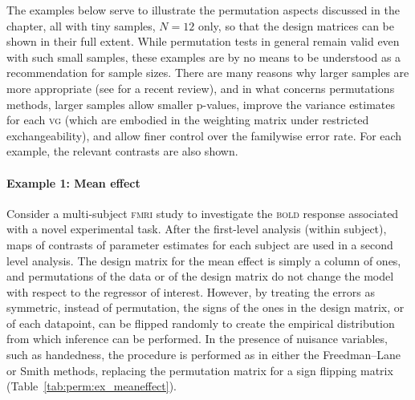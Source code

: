 The examples below serve to illustrate the permutation aspects discussed in the chapter, all with tiny samples, $N=12$ only, so that the design matrices can be shown in their full extent. While permutation tests in general remain valid even with such small samples, these examples are by no means to be understood as a recommendation for sample sizes. There are many reasons why larger samples are more appropriate (see \citet{Button2013} for a recent review), and in what concerns permutations methods, larger samples allow smaller p-values, improve the variance estimates for each \textsc{vg} (which are embodied in the weighting matrix under restricted exchangeability), and allow finer control over the familywise error rate. For each example, the relevant contrasts are also shown.

\paragraph{Example 1: Mean effect} Consider a multi-subject \textsc{fmri} study to investigate the \textsc{bold} response associated with a novel experimental task. After the first-level analysis (within subject), maps of contrasts of parameter estimates for each subject are used in a second level analysis. The design matrix for the mean effect is simply a column of ones, and permutations of the data or of the design matrix do not change the model with respect to the regressor of interest. However, by treating the errors as symmetric, instead of permutation, the signs of the ones in the design matrix, or of each datapoint, can be flipped randomly to create the empirical distribution from which inference can be performed. In the presence of nuisance variables, such as handedness, the procedure is performed as in either the Freedman--Lane or Smith methods, replacing the permutation matrix for a sign flipping matrix (Table~\ref{tab:perm:ex_meaneffect}).

